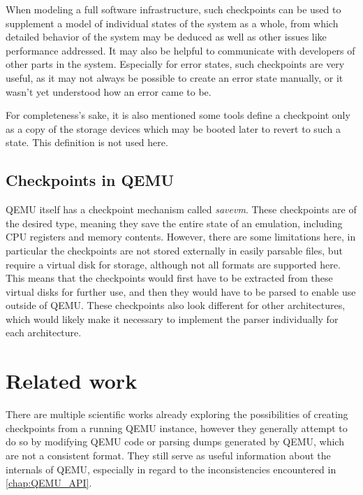 When modeling a full software infrastructure,
such checkpoints can be used to supplement a model of individual states of the system as a whole,
from which detailed behavior of the system may be deduced
as well as other issues like performance addressed.
It may also be helpful to communicate with developers of other parts in the system.
Especially for error states, such checkpoints are very useful,
as it may not always be possible to create an error state manually,
or it wasn't yet understood how an error came to be.

For completeness's sake, it is also mentioned some tools define a checkpoint only as a copy of the storage devices
which may be booted later to revert to such a state.
This definition is not used here.

\subsection{Checkpoints in QEMU}
QEMU itself has a checkpoint mechanism called \emph{savevm}.
These checkpoints are of the desired type, meaning they save the entire state of an emulation,
including CPU registers and memory contents.
However, there are some limitations here, in particular the checkpoints are not stored externally in easily parsable files,
but require a virtual disk for storage, although not all formats are supported here.
This means that the checkpoints would first have to be extracted from these virtual disks for further use,
and then they would have to be parsed to enable use outside of QEMU.
These checkpoints also look different for other architectures, which would likely make it necessary
to implement the parser individually for each architecture.

\section{Related work}
There are multiple scientific works already exploring the possibilities of creating checkpoints from a running QEMU instance,
however they generally attempt to do so by modifying QEMU code or parsing dumps generated by QEMU,
which are not a consistent format.
They still serve as useful information about the internals of QEMU,
especially in regard to the inconsistencies encountered in \autoref{chap:QEMU_API}.

